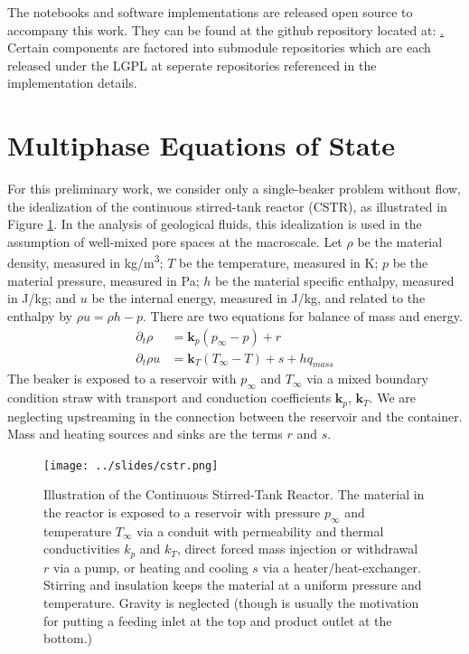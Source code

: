 \documentclass[AMA,STIX1COL]{WileyNJD-v2}
\begin{document}
The notebooks and software implementations are released open source to
accompany this work. They can be found at the github repository
located at: \href{https://github.com/afqueiruga/latentsim}.
Certain components are factored into submodule repositories which are
each released under the LGPL at seperate repositories referenced in
the implementation details.

\section{Multiphase Equations of State}


For this preliminary work, we consider only a single-beaker problem
without flow, the idealization of the continuous stirred-tank reactor (CSTR), as illustrated
in Figure \ref{fig:cstr}. 
In the analysis of geological fluids, this idealization is used in the
assumption of well-mixed pore spaces at the macroscale.  Let \(\rho\)
be the material density, measured in \si{kg/m^3}; \(T\) be the
temperature, measured in \si{K}; \(p\) be the material pressure,
measured in \si{Pa}; \(h\) be the material
specific enthalpy, measured in \si{J/kg}; and \(u\) be the internal
energy, measured in \si{J/kg}, and related to the enthalpy by  \(\rho u = \rho h - p\). There are two equations for
balance of mass and energy.
\begin{align}
\partial_t \rho & = \mathbf{k}_p(p_\infty - p) + r\\
\partial_t \rho u & = \mathbf{k}_T(T_\infty-T) + s + h q_{mass}
\end{align}
The beaker is exposed to a reservoir with \(p_\infty\) and \(T_\infty\)
via a mixed boundary condition straw with transport and conduction
coefficients \(\mathbf{k}_p\), \(\mathbf{k}_T\). 
We are neglecting upstreaming in the connection between the reservoir
and the container. Mass and heating
sources and sinks are the terms \(r\) and \(s\).


\begin{figure}
  \centering
  \texttt{[image: ../slides/cstr.png]}
  \caption{ \label{fig:cstr} Illustration of the Continuous
    Stirred-Tank    
  Reactor. The material in the reactor is exposed to a reservoir with
  pressure
  $p_\infty$ and temperature $T_\infty$ via a conduit with permeability
  and thermal conductivities $k_p$ and $k_T$, direct forced mass
  injection or withdrawal $r$ via a pump, or heating and cooling $s$
  via a heater/heat-exchanger. Stirring and insulation keeps the
  material at a uniform pressure and temperature. Gravity is
  neglected (though is usually the motivation for putting a feeding inlet at
the top and product outlet at the bottom.)}
\end{figure}
\end{document}
